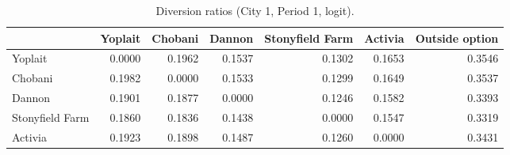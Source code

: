 \begin{table}[H]
\centering
\caption{Diversion ratios (City 1, Period 1, logit).}
\label{tab:q10_div_c1t1_fe}
\begin{tabular}{lrrrrrr}
\toprule
 & Yoplait & Chobani & Dannon & Stonyfield Farm & Activia & Outside option \\
\midrule
Yoplait & 0.0000 & 0.1962 & 0.1537 & 0.1302 & 0.1653 & 0.3546 \\
Chobani & 0.1982 & 0.0000 & 0.1533 & 0.1299 & 0.1649 & 0.3537 \\
Dannon & 0.1901 & 0.1877 & 0.0000 & 0.1246 & 0.1582 & 0.3393 \\
Stonyfield Farm & 0.1860 & 0.1836 & 0.1438 & 0.0000 & 0.1547 & 0.3319 \\
Activia & 0.1923 & 0.1898 & 0.1487 & 0.1260 & 0.0000 & 0.3431 \\
\bottomrule
\end{tabular}
\end{table}
